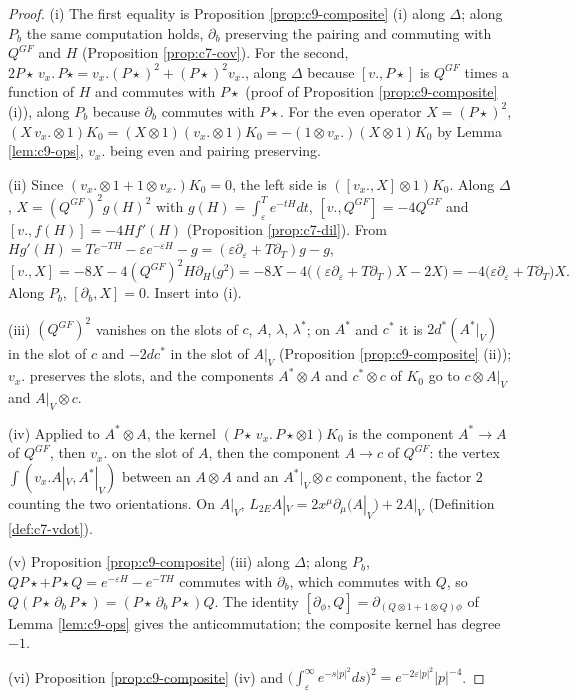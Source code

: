 \begin{proof}
(i) The first equality is Proposition \ref{prop:c9-composite} (i) along $\Delta$; along $P_b$ the same computation holds, $\partial_b$ preserving the pairing and commuting with $Q^{GF}$ and $H$ (Proposition \ref{prop:c7-cov}). For the second, $2P\star\,v_x.\,P\star=v_x.(P\star)^2+(P\star)^2v_x.$, along $\Delta$ because $[v.,P\star]$ is $Q^{GF}$ times a function of $H$ and commutes with $P\star$ (proof of Proposition \ref{prop:c9-composite} (i)), along $P_b$ because $\partial_b$ commutes with $P\star$. For the even operator $X=(P\star)^2$, $(X\,v_x.\otimes1)K_0=(X\otimes1)(v_x.\otimes1)K_0=-(1\otimes v_x.)(X\otimes1)K_0$ by Lemma \ref{lem:c9-ops}, $v_x.$ being even and pairing preserving.

(ii) Since $(v_x.\otimes1+1\otimes v_x.)K_0=0$, the left side is $([v_x.,X]\otimes1)K_0$. Along $\Delta$, $X=(Q^{GF})^2g(H)^2$ with $g(H)=\int_\varepsilon^Te^{-tH}dt$, $[v.,Q^{GF}]=-4Q^{GF}$ and $[v.,f(H)]=-4Hf'(H)$ (Proposition \ref{prop:c7-dil}). From $Hg'(H)=Te^{-TH}-\varepsilon e^{-\varepsilon H}-g=(\varepsilon\partial_\varepsilon+T\partial_T)g-g$,
\[
[v.,X]=-8X-4(Q^{GF})^2H\partial_H\big(g^2\big)=-8X-4\big((\varepsilon\partial_\varepsilon+T\partial_T)X-2X\big)=-4\big(\varepsilon\partial_\varepsilon+T\partial_T\big)X .
\]
Along $P_b$, $[\partial_b,X]=0$. Insert into (i).

(iii) $(Q^{GF})^2$ vanishes on the slots of $c$, $A$, $\lambda$, $\lambda^*$; on $A^*$ and $c^*$ it is $2d^*(A^*|_V)$ in the slot of $c$ and $-2dc^*$ in the slot of $A|_V$ (Proposition \ref{prop:c9-composite} (ii)); $v_x.$ preserves the slots, and the components $A^*\otimes A$ and $c^*\otimes c$ of $K_0$ go to $c\otimes A|_V$ and $A|_V\otimes c$.

(iv) Applied to $A^*\otimes A$, the kernel $(P\star\,v_x.\,P\star\otimes1)K_0$ is the component $A^*\to A$ of $Q^{GF}$, then $v_x.$ on the slot of $A$, then the component $A\to c$ of $Q^{GF}$: the vertex $\int(v_x.A|_V,A^*|_V)$ between an $A\otimes A$ and an $A^*|_V\otimes c$ component, the factor $2$ counting the two orientations. On $A|_V$, $L_{2E}A|_V=2x^\mu\partial_\mu(A|_V)+2A|_V$ (Definition \ref{def:c7-vdot}).

(v) Proposition \ref{prop:c9-composite} (iii) along $\Delta$; along $P_b$, $QP\star+P\star Q=e^{-\varepsilon H}-e^{-TH}$ commutes with $\partial_b$, which commutes with $Q$, so $Q(P\star\,\partial_b\,P\star)=(P\star\,\partial_b\,P\star)Q$. The identity $[\partial_\phi,Q]=\partial_{(Q\otimes1+1\otimes Q)\phi}$ of Lemma \ref{lem:c9-ops} gives the anticommutation; the composite kernel has degree $-1$.

(vi) Proposition \ref{prop:c9-composite} (iv) and $\big(\int_\varepsilon^\infty e^{-s|p|^2}ds\big)^2=e^{-2\varepsilon|p|^2}|p|^{-4}$.
\end{proof}

